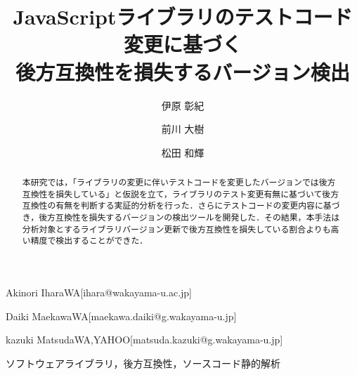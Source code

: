 \documentclass[submit]{ipsj}
\begin{document}
\title{JavaScriptライブラリのテストコード変更に基づく\\後方互換性を損失するバージョン検出}





\author{伊原 彰紀}{Akinori Ihara}{WA}[ihara@wakayama-u.ac.jp]
\author{前川 大樹}{Daiki Maekawa}{WA}[maekawa.daiki@g.wakayama-u.jp]
\author{松田 和輝}{kazuki Matsuda}{WA,YAHOO}[matsuda.kazuki@g.wakayama-u.jp]

\begin{abstract}
本研究では，「ライブラリの変更に伴いテストコードを変更したバージョンでは後方互換性を損失している」と仮説を立て，ライブラリのテスト変更有無に基づいて後方互換性の有無を判断する実証的分析を行った．さらにテストコードの変更内容に基づき，後方互換性を損失するバージョンの検出ツールを開発した．その結果，本手法は分析対象とするライブラリバージョン更新で後方互換性を損失している割合よりも高い精度で検出することができた．

\end{abstract}


\begin{jkeyword}
ソフトウェアライブラリ，後方互換性，ソースコード静的解析
\end{jkeyword}
\end{document}
